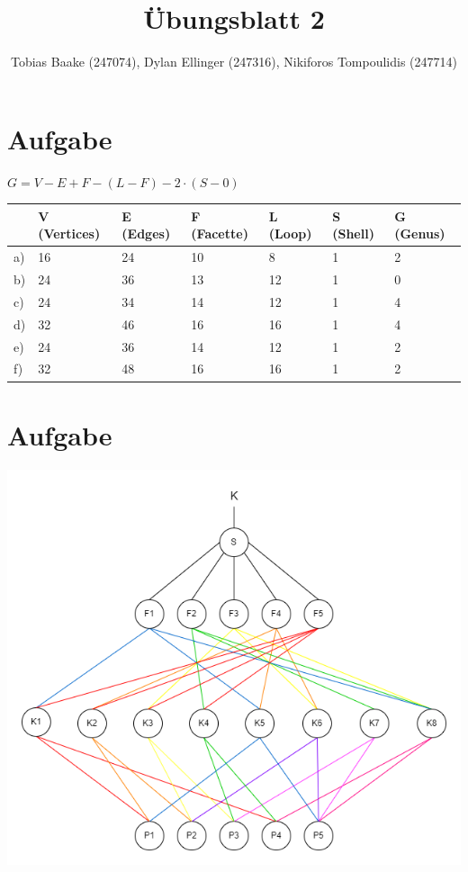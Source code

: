 \documentclass{article}
\title{Übungsblatt 2}
\author{Tobias Baake (247074), Dylan Ellinger (247316), Nikiforos Tompoulidis (247714)}
\begin{document}
\maketitle

\section{Aufgabe}

$G = V - E + F - (L - F) - 2 \cdot (S - 0)$

\begin{table}[!ht]
    \centering
    \begin{tabular}{|l|l|l|l|l|l|l|}
    \hline
         \  & V (Vertices) & E (Edges) & F (Facette) & L (Loop) & S (Shell) & G (Genus)  \\ \hline
        a) & 16 & 24 & 10 & 8 & 1 & 2 \\ \hline
        b) & 24 & 36 & 13 & 12 & 1 & 0 \\ \hline
        c) & 24 & 34 & 14 & 12 & 1 & 4 \\ \hline
        d) & 32 & 46 & 16 & 16 & 1 & 4 \\ \hline
        e) & 24 & 36 & 14 & 12 & 1 & 2 \\ \hline
        f) & 32 & 48 & 16 & 16 & 1 & 2 \\ \hline
    \end{tabular}
\end{table}

\section{Aufgabe}
\includegraphics[width=400pt]{./files/Übung2.2.drawio.png}
\end{document}
